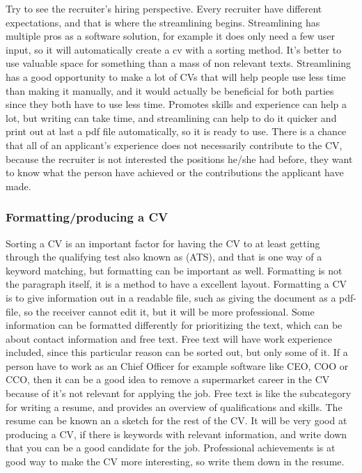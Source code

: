Try to see the recruiter's hiring perspective. Every recruiter have different expectations, 
and that is where the streamlining begins. Streamlining has multiple pros as a software solution,
for example it does only need a few user input, so it will automatically create a cv with a sorting method. 
It's better to use valuable space for something than a mass of non relevant texts.
Streamlining has a good opportunity to make a lot of CVs that will help people use less time than making it manually,
and it would actually be beneficial for both parties since they both have to use less time.
Promotes skills and experience can help a lot, but writing can take time, and streamlining can help to do it quicker 
and print out at last a pdf file automatically, so it is ready to use.
There is a chance that all of an applicant's experience does not necessarily contribute to the CV, 
because the recruiter is not interested the positions he/she had before, they want to know what the person have achieved
or the contributions the applicant have made. 

\subsubsection{Formatting/producing a CV}
Sorting a CV is an important factor for having the CV to at least getting through the qualifying test also known as (ATS),
and that is one way of a keyword matching, but formatting can be important as well.
Formatting is not the paragraph itself, it is a method to have a excellent layout. 
Formatting a CV is to give information out in a readable file, such as giving the document as a pdf-file,
so the receiver cannot edit it, but it will be more professional.
Some information can be formatted differently for prioritizing the text, which can be about contact information and free text.
Free text will have work experience included, since this particular reason can be sorted out, but only some of it. 
If a person have to work as an Chief Officer for example software like CEO, COO or CCO, 
then it can be a good idea to remove a supermarket career in the CV because of it's not relevant for applying the job. 
Free text is like the subcategory for writing a resume,
and provides an overview of qualifications and skills. The resume can be known an a sketch for the rest of the CV. 
It will be very good at producing a CV, if there is keywords with relevant information, 
and write down that you can be a good candidate for the job.
Professional achievements is at good way to make the CV more interesting, so write them down in the resume.

